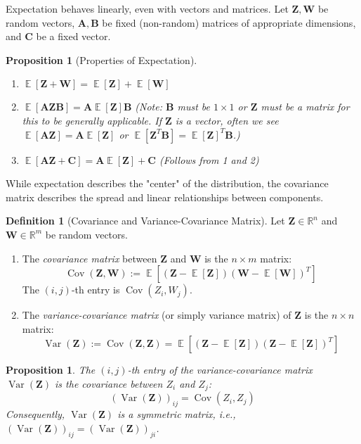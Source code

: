 \documentclass[11pt]{article}
\newtheorem{proposition}[theorem]{Proposition}
\theoremstyle{definition}
\newtheorem{definition}[theorem]{Definition}
\theoremstyle{remark}
\DeclareMathOperator{\E}{\mathbb{E}}
\DeclareMathOperator{\Var}{\operatorname{Var}}
\DeclareMathOperator{\Cov}{\operatorname{Cov}}
\begin{document}
Expectation behaves linearly, even with vectors and matrices. Let $\bm{Z}, \bm{W}$ be random vectors, $\bm{A}, \bm{B}$ be fixed (non-random) matrices of appropriate dimensions, and $\bm{C}$ be a fixed vector.
\begin{proposition}[Properties of Expectation]
    \begin{enumerate}
        \item $\E[\bm{Z}+\boldsymbol{W}]=\E[\boldsymbol{Z}]+\E[\boldsymbol{W}]$
        \item $\E[\boldsymbol{A} \boldsymbol{Z} \boldsymbol{B}]=\boldsymbol{A} \E[\boldsymbol{Z}] \boldsymbol{B}$ (Note: $\bm{B}$ must be $1 \times 1$ or $\bm{Z}$ must be a matrix for this to be generally applicable. If $\bm{Z}$ is a vector, often we see $\E[\bm{A}\bm{Z}] = \bm{A}\E[\bm{Z}]$ or $\E[\bm{Z}^T\bm{B}] = \E[\bm{Z}]^T\bm{B}$.)
        \item $\E[\boldsymbol{A} \bm{Z}+\boldsymbol{C}]=\boldsymbol{A} \E[\bm{Z}]+\boldsymbol{C}$ (Follows from 1 and 2)
    \end{enumerate}
\end{proposition}

While expectation describes the "center" of the distribution, the covariance matrix describes the spread and linear relationships between components.

\begin{definition}[Covariance and Variance-Covariance Matrix]
    Let $\bm{Z} \in \mathbb{R}^n$ and $\bm{W} \in \mathbb{R}^m$ be random vectors.
    \begin{enumerate}
        \item The \emph{covariance matrix} between $\bm{Z}$ and $\bm{W}$ is the $n \times m$ matrix:
        \[
        \Cov(\bm{Z}, \bm{W}) := \E\left[ (\bm{Z} - \E[\bm{Z}]) (\bm{W} - \E[\bm{W}])^T \right]
        \]
        The $(i, j)$-th entry is $\Cov(Z_i, W_j)$.
        \item The \emph{variance-covariance matrix} (or simply variance matrix) of $\bm{Z}$ is the $n \times n$ matrix:
        \[
        \Var(\bm{Z}) := \Cov(\bm{Z}, \bm{Z}) = \E\left[ (\bm{Z} - \E[\bm{Z}]) (\bm{Z} - \E[\bm{Z}])^T \right]
        \]
    \end{enumerate}
\end{definition}

\begin{proposition}
    The $(i, j)$-th entry of the variance-covariance matrix $\Var(\bm{Z})$ is the covariance between $Z_i$ and $Z_j$:
    \[
    (\Var(\bm{Z}))_{ij} = \Cov(Z_i, Z_j)
    \]
    Consequently, $\Var(\bm{Z})$ is a symmetric matrix, i.e., $(\Var(\bm{Z}))_{ij} = (\Var(\bm{Z}))_{ji}$.
\end{proposition}
\end{document}

